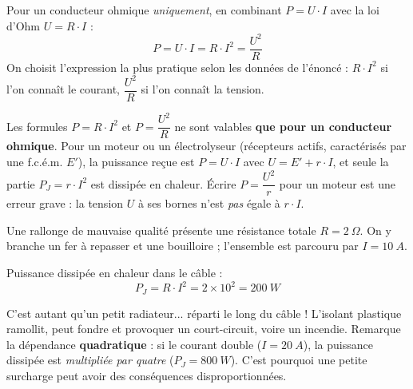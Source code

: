 \documentclass[11pt]{article}
\begin{document}
\begin{aretenir}
Pour un conducteur ohmique \emph{uniquement}, en combinant $P = U \cdot I$ avec la loi d'Ohm $U = R \cdot I$ :
\[ P = U \cdot I = R \cdot I^2 = \frac{U^2}{R} \]
On choisit l'expression la plus pratique selon les données de l'énoncé : $R \cdot I^2$ si l'on connaît le courant, $\dfrac{U^2}{R}$ si l'on connaît la tension.
\end{aretenir}

\begin{attention}
Les formules $P = R \cdot I^2$ et $P = \dfrac{U^2}{R}$ ne sont valables \textbf{que pour un conducteur ohmique}. Pour un moteur ou un électrolyseur (récepteurs actifs, caractérisés par une f.c.é.m. $E'$), la puissance reçue est $P = U \cdot I$ avec $U = E' + r \cdot I$, et seule la partie $P_J = r \cdot I^2$ est dissipée en chaleur. Écrire $P = \dfrac{U^2}{r}$ pour un moteur est une erreur grave : la tension $U$ à ses bornes n'est \emph{pas} égale à $r \cdot I$.
\end{attention}

\begin{exemplebox}
Une rallonge de mauvaise qualité présente une résistance totale $R = \SI{2}{\Omega}$. On y branche un fer à repasser et une bouilloire ; l'ensemble est parcouru par $I = \SI{10}{A}$.

Puissance dissipée en chaleur dans le câble :
\[ P_J = R \cdot I^2 = 2 \times 10^2 = \SI{200}{W} \]

C'est autant qu'un petit radiateur... réparti le long du câble ! L'isolant plastique ramollit, peut fondre et provoquer un court-circuit, voire un incendie. Remarque la dépendance \textbf{quadratique} : si le courant double ($I = \SI{20}{A}$), la puissance dissipée est \emph{multipliée par quatre} ($P_J = \SI{800}{W}$). C'est pourquoi une petite surcharge peut avoir des conséquences disproportionnées.
\end{exemplebox}
\end{document}
